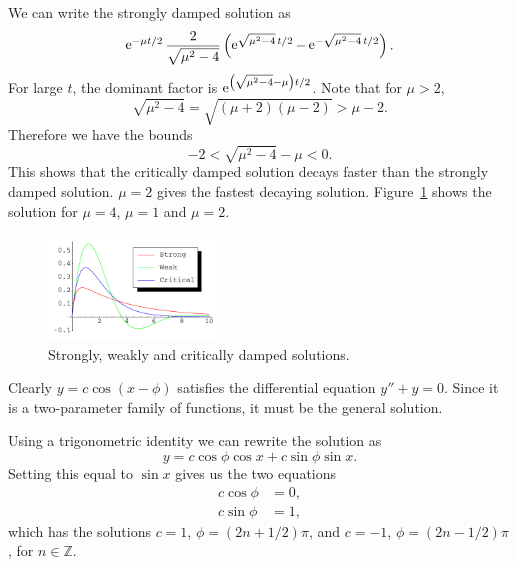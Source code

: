 {\begin{Solution}
  We can write the strongly damped solution as
  \[
  \mathop{\mathrm{e}}\nolimits^{-\mu t / 2} \frac{2}{\sqrt{\mu^2-4}} 
  \left( \mathop{\mathrm{e}}\nolimits^{\sqrt{\mu^2 - 4}\, t / 2} 
    - \mathop{\mathrm{e}}\nolimits^{-\sqrt{\mu^2 - 4}\, t / 2} \right).
  \]
  For large $t$, the dominant factor is 
  $\mathop{\mathrm{e}}\nolimits^{\left( \sqrt{\mu^2 - 4} - \mu \right) t / 2}$.  Note that for $\mu > 2$,
  \[
  \sqrt{\mu^2 - 4} = \sqrt{(\mu+2)(\mu-2)} > \mu - 2.
  \]
  Therefore we have the bounds
  \[
  -2 < \sqrt{\mu^2 - 4} - \mu < 0.
  \]
  This shows that the critically damped solution decays faster than the
  strongly damped solution.  $\mu = 2$ gives the fastest decaying solution.
  Figure~\ref{damped} shows the solution for $\mu = 4$, $\mu = 1$ and 
  $\mu = 2$.
  \begin{figure}[tb!]
    \begin{center}
      \includegraphics[width=0.4\textwidth]{ode/techniques_linear/damped}
    \end{center}
    \caption{Strongly, weakly and critically damped solutions.}
    \label{damped}
  \end{figure}
\end{Solution}










\begin{Solution}
  \label{solution y=c cos x-phi}
  Clearly $y = c \cos(x - \phi)$ satisfies the differential equation 
  $y'' + y = 0$.  Since it is a two-parameter family of functions, 
  it must be the general solution.

  Using a trigonometric identity we can rewrite the solution as
  \[
  y = c \cos \phi \cos x + c \sin \phi \sin x.
  \]
  Setting this equal to $\sin x$ gives us the two equations
  \begin{align*}
    c \cos \phi &= 0, \\
    c \sin \phi &= 1,
  \end{align*}
  which has the solutions $c = 1$, $\phi = (2 n + 1/2) \pi$, and 
  $c = -1$, $\phi = (2 n - 1/2) \pi$, for $n \in \mathbb{Z}$.


\end{Solution}}
